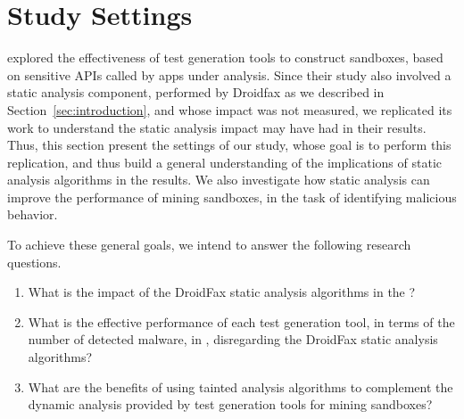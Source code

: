 \section{Study Settings}


\blls explored the effectiveness of test generation tools to construct sandboxes, based on sensitive APIs called by apps under analysis. Since their study also involved a static analysis component, performed by Droidfax as we described in Section~\ref{sec:introduction}, and whose impact was not measured, we replicated its work to understand the static analysis impact may have had in their results. Thus, this section present the settings of our study, whose goal is to perform this replication, and thus build a general understanding of the implications of static analysis algorithms in the results. We also investigate how static analysis can improve the performance of mining sandboxes, in the task of identifying malicious behavior.

To achieve these general goals, we intend to answer the following research questions.

\begin{enumerate}[(RQ1)]
 
 \item What is the impact of the DroidFax static analysis algorithms in the \blls?
  
 \item What is the effective performance of each test generation tool, in terms of the number of detected malware, in \blls, disregarding the DroidFax
  static analysis algorithms?

 \item What are the benefits of using tainted analysis algorithms to complement the dynamic analysis provided by test generation tools for mining sandboxes?
\end{enumerate}


